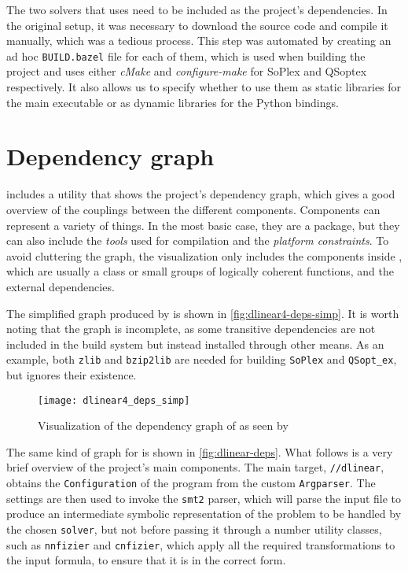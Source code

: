 The two solvers that \dlinear uses need to be included as the project's dependencies.
In the original setup, it was necessary to download the source code and compile it manually, which was a tedious process.
This step was automated by creating an ad hoc \texttt{BUILD.bazel} file for each of them, which is used when building the project and uses either \textit{cMake} and \textit{configure-make} for SoPlex and QSoptex respectively.
It also allows us to specify whether to use them as static libraries for the main executable or as dynamic libraries for the Python bindings.



\section{Dependency graph}
\label{sec:dependency_graph}

\bazel includes a utility that shows the project's dependency graph, which gives a good overview of the couplings between the different components.
Components can represent a variety of things.
In the most basic case, they are a \bazel package, but they can also include the \textit{tools} used for compilation and the \textit{platform constraints}.
To avoid cluttering the graph, the visualization only includes the components inside \dlinear, which are usually a class or small groups of logically coherent functions, and the external dependencies.

The simplified graph produced by \dlinearfour is shown in \autoref{fig:dlinear4-deps-simp}.
It is worth noting that the graph is incomplete, as some transitive dependencies are not included in the \bazel build system but instead installed through other means.
As an example, both \texttt{zlib} and \texttt{bzip2lib} are needed for building \texttt{SoPlex} and \texttt{QSopt\_ex}, but \bazel ignores their existence.

\begin{figure}[!h]
    \centering
    \texttt{[image: dlinear4\_deps\_simp]}
    \caption{Visualization of the dependency graph of \dlinearfour as seen by \bazel}\label{fig:dlinear4-deps-simp}
\end{figure}

\clearpage

The same kind of graph for \dlinear is shown in \autoref{fig:dlinear-deps}.
What follows is a very brief overview of the project's main components.
The main target, \texttt{//dlinear}, obtains the \texttt{Configuration} of the program from the custom \texttt{Argparser}.
The settings are then used to invoke the \texttt{smt2} parser, which will parse the input file to produce an intermediate symbolic representation of the problem to be handled by the chosen \texttt{solver}, but not before passing it through a number utility classes, such as \texttt{nnfizier} and \texttt{cnfizier}, which apply all the required transformations to the input formula, to ensure that it is in the correct form.

